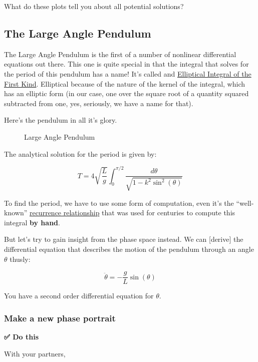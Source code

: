 What do these plots tell you about all potential solutions?

\subsection{The Large Angle Pendulum}\label{the-large-angle-pendulum}

The Large Angle Pendulum is the first of a number of nonlinear
differential equations out there. This one is quite special in that the
integral that solves for the period of this pendulum has a name! It's
called and
\href{https://en.wikipedia.org/wiki/Elliptic_integral}{Elliptical
Integral of the First Kind}. Elliptical because of the nature of the
kernel of the integral, which has an elliptic form (in our case, one
over the square root of a quantity squared subtracted from one, yes,
seriously, we have a name for that).

Here's the pendulum in all it's glory.

\begin{figure}
\centering
{}
\caption{Large Angle Pendulum}
\end{figure}

The analytical solution for the period is given by:

\[T = 4\sqrt{\dfrac{L}{g}}\int_0^{\pi/2}\dfrac{d\theta}{\sqrt{1-k^2\sin^2(\theta)}}\]

To find the period, we have to use some form of computation, even it's
the ``well-known''
\href{https://en.wikipedia.org/wiki/Elliptic_integral\#Complete_elliptic_integral_of_the_first_kind}{recurrence
relationship} that was used for centuries to compute this integral
\textbf{by hand}.

But let's try to gain insight from the phase space instead. We can
{[}derive{]} the differential equation that describes the motion of the
pendulum through an angle \(\theta\) thusly:

\[\ddot{\theta} = -\dfrac{g}{L}\sin(\theta)\]

You have a second order differential equation for \(\theta\).

\subsubsection{Make a new phase
portrait}\label{make-a-new-phase-portrait}

\textbf{✅ Do this}

With your partners,

